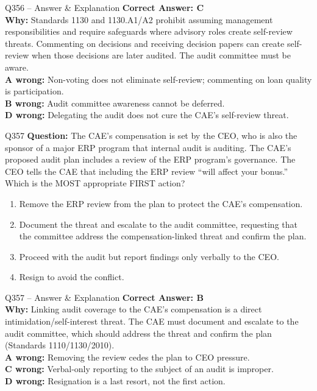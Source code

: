 \documentclass[aspectratio=169,10pt]{beamer}
\begin{document}
	\begin{frame}[t]{Q356 -- Answer \& Explanation}
		\small
		\textbf{Correct Answer: C} \\[4pt]
		\textbf{Why:} Standards 1130 and 1130.A1/A2 prohibit assuming management responsibilities and require safeguards where advisory roles create self-review threats. Commenting on decisions and receiving decision papers can create self-review when those decisions are later audited. The audit committee must be aware. \\[4pt]
		\textbf{A wrong:} Non-voting does not eliminate self-review; commenting on loan quality is participation. \\[2pt]
		\textbf{B wrong:} Audit committee awareness cannot be deferred. \\[2pt]
		\textbf{D wrong:} Delegating the audit does not cure the CAE's self-review threat.
	\end{frame}
	
	\begin{frame}[t]{Q357}
		\small
		\textbf{Question:} The CAE's compensation is set by the CEO, who is also the sponsor of a major ERP program that internal audit is auditing. The CAE's proposed audit plan includes a review of the ERP program's governance. The CEO tells the CAE that including the ERP review ``will affect your bonus.'' Which is the MOST appropriate FIRST action?
		\begin{enumerate}[label=\Alph*.,itemsep=1pt,topsep=2pt]
			\item Remove the ERP review from the plan to protect the CAE's compensation.
			\item Document the threat and escalate to the audit committee, requesting that the committee address the compensation-linked threat and confirm the plan.
			\item Proceed with the audit but report findings only verbally to the CEO.
			\item Resign to avoid the conflict.
		\end{enumerate}
	\end{frame}
	
	\begin{frame}[t]{Q357 -- Answer \& Explanation}
		\small
		\textbf{Correct Answer: B} \\[4pt]
		\textbf{Why:} Linking audit coverage to the CAE's compensation is a direct intimidation/self-interest threat. The CAE must document and escalate to the audit committee, which should address the threat and confirm the plan (Standards 1110/1130/2010). \\[4pt]
		\textbf{A wrong:} Removing the review cedes the plan to CEO pressure. \\[2pt]
		\textbf{C wrong:} Verbal-only reporting to the subject of an audit is improper. \\[2pt]
		\textbf{D wrong:} Resignation is a last resort, not the first action.
	\end{frame}
	
\end{document}
